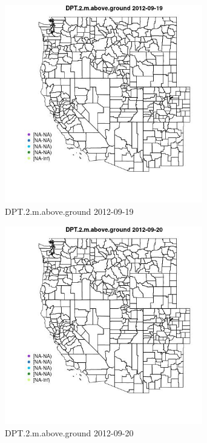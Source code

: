 \clearpage 

\begin{figure} 
\centering  
\includegraphics[width=0.77\textwidth]{Code_Outputs/ML_input_report_ML_input_PM25_Step5_part_d_de_duplicated_aves_ML_input_MapObsDPT2maboveground2012-09-19.jpg} 
\caption{\label{fig:ML_input_report_ML_input_PM25_Step5_part_d_de_duplicated_aves_ML_inputMapObsDPT2maboveground2012-09-19}DPT.2.m.above.ground 2012-09-19} 
\end{figure} 
 

\begin{figure} 
\centering  
\includegraphics[width=0.77\textwidth]{Code_Outputs/ML_input_report_ML_input_PM25_Step5_part_d_de_duplicated_aves_ML_input_MapObsDPT2maboveground2012-09-20.jpg} 
\caption{\label{fig:ML_input_report_ML_input_PM25_Step5_part_d_de_duplicated_aves_ML_inputMapObsDPT2maboveground2012-09-20}DPT.2.m.above.ground 2012-09-20} 
\end{figure} 
 

